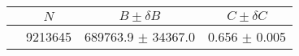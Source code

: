 \begin{tabular}{lccc}
\hline
    &   $N$   & $B \pm \delta B$  &  $C \pm \delta C$ \\
\hline
                               & 9213645    & 689763.9   $\pm$ 34367.0 & 0.656      $\pm$ 0.005 \\
\hline
\end{tabular}

